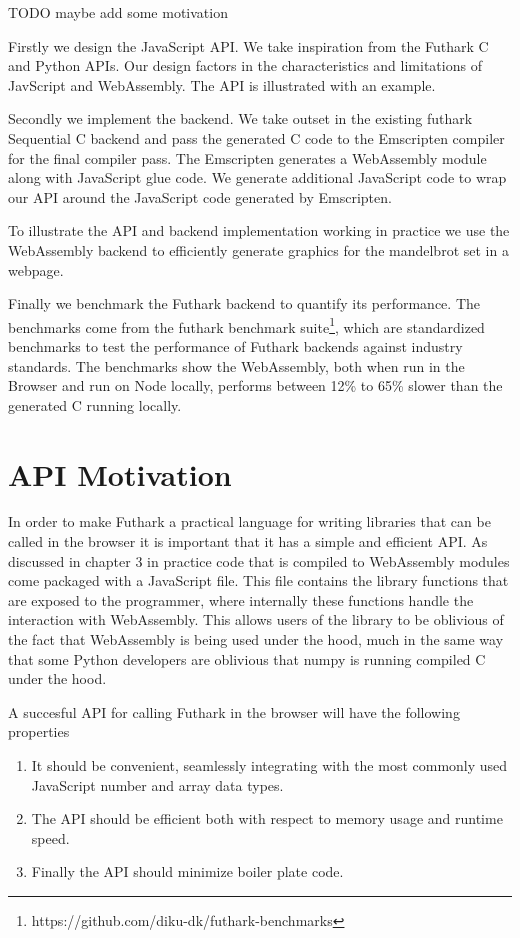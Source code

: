 \documentclass[11pt]{book}
\begin{document}
TODO maybe add some motivation

Firstly we design the JavaScript API. We take inspiration from the Futhark C and Python APIs. Our design factors in the characteristics and limitations of JavScript and WebAssembly. The API is illustrated with an example.



Secondly we implement the backend. We take outset in the existing futhark Sequential C backend and pass the generated C code to the Emscripten compiler for the final compiler pass. The Emscripten generates a WebAssembly module along with JavaScript glue code. We generate additional JavaScript code to wrap our API around the JavaScript code generated by Emscripten.

To illustrate the API and backend implementation working in practice we use the WebAssembly backend to efficiently generate graphics for the mandelbrot set in a webpage.

Finally we benchmark the Futhark backend to quantify its performance. The benchmarks come from the futhark benchmark suite\footnote{https://github.com/diku-dk/futhark-benchmarks}, which are standardized benchmarks to test the performance of Futhark backends against industry standards. The benchmarks show the WebAssembly, both when run in the Browser and run on Node locally, performs between 12\% to 65\% slower than the generated C running locally. 

\section{API Motivation}

In order to make Futhark a practical language for writing libraries that can be called in the browser it is important that it has a simple and efficient API. As discussed in chapter 3 in practice code that is compiled to WebAssembly modules come packaged with a JavaScript file. This file contains the library functions that are exposed to the programmer, where internally these functions handle the interaction with WebAssembly. This allows users of the library to be oblivious of the fact that WebAssembly is being used under the hood, much in the same way that some Python developers are oblivious that numpy is running compiled C under the hood.

A succesful API for calling Futhark in the browser will have the following properties
\begin{enumerate}
    \item It should be convenient, seamlessly integrating with the most commonly used JavaScript number and array data types.
    \item The API should be efficient both with respect to memory usage and runtime speed.
    \item Finally the API should minimize boiler plate code.
\end{enumerate}
\end{document}
